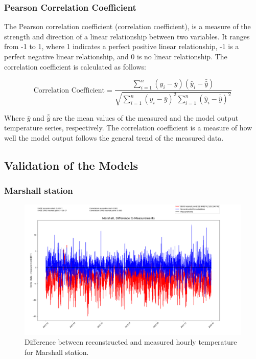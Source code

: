 \subsubsection*{Pearson Correlation Coefficient}

The Pearson correlation coefficient (correlation coefficient), is a measure of the strength and direction of a linear relationship between two variables.
It ranges from -1 to 1, where 1 indicates a perfect positive linear relationship, -1 is a perfect negative linear relationship, and 0 is no linear relationship. The correlation coefficient is calculated as follows:

\begin{equation}
    \text{Correlation Coefficient} = \frac{\sum_{i=1}^{n} (y_i - \bar{y})(\hat{y}_i - \bar{\hat{y}})}{\sqrt{\sum_{i=1}^{n} (y_i - \bar{y})^2 \sum_{i=1}^{n} (\hat{y}_i - \bar{\hat{y}})^2}}
    \label{eq: correlation}
\end{equation}
    
Where $\bar{y}$ and $\bar{\hat{y}}$ are the mean values of the measured and the model output temperature series, respectively.
The correlation coefficient is a measure of how well the model output follows the general trend of the measured data. \cite{Zou2003Correlation}

\subsection{Validation of the Models}
\label{subsec: validation_results}

\subsubsection*{Marshall station}

\begin{figure}
    \centering
    \includegraphics[width=1.00\textwidth]{resources/images/charts/marshall_eval_grib_final/Marshall, Difference to Measurements.png}
    \caption{Difference between reconstructed and measured hourly temperature for Marshall station.}
    \label{fig: marshall_diff}
\end{figure}

